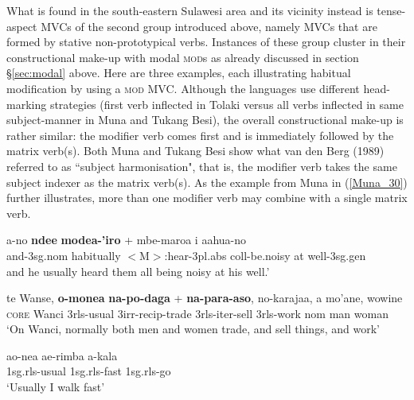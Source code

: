 What is found in the south-eastern Sulawesi area and its vicinity instead is tense-aspect MVCs of the second group introduced above, namely MVCs that are formed by stative non-prototypical verbs. Instances of these group cluster in their constructional make-up with modal \textsc{mod}s as already discussed in section §\ref{sec:modal} above. Here are three examples, each illustrating habitual modification by using a \textsc{mod} MVC. Although the languages use different head-marking strategies (first verb inflected in Tolaki versus all verbs inflected in same subject-manner in Muna and Tukang Besi), the overall constructional make-up is rather similar: the modifier verb comes first and is immediately followed by the matrix verb(s). Both Muna and Tukang Besi show what van den Berg (1989) referred to as ``subject harmonisation", that is, the modifier verb takes the same subject indexer as the matrix verb(s). As the example from Muna in (\ref{Muna_30}) further illustrates, more than one modifier verb may combine with a single matrix verb.

\ea \label{Tolaki_39}
\gll a-no \textbf{ndee} \textbf{modea-'iro} + mbe-maroa i aahua-no \\
and-3\acs{sg}.\acs{nom} habitually $<$M$>$:hear-3\acs{pl}.\acs{abs} \acs{coll}-be.noisy at well-3\acs{sg}.\acs{gen} \\
\glft * and he usually heard them all being noisy at his well.' \\ 
\z
\xe

\ea \label{Tukang_62}
\gll te Wanse, \textbf{o-monea} \textbf{na-po-daga} + \textbf{na-para-aso}, no-karajaa, a mo'ane, wowine \\
\textsc{core} Wanci 3\acs{rls}-usual 3\acs{irr}-\acs{recip}-trade 3\acs{rls}-\acs{iter}-sell 3\acs{rls}-work \acs{nom} man woman \\
\glft `On Wanci, normally both men and women trade, and sell things, and work' \\ 
\z
\xe

\ea \label{Muna_30}
\gll ao-nea ae-rimba a-kala \\
1\acs{sg}.\acs{rls}-usual 1\acs{sg}.\acs{rls}-fast 1\acs{sg}.\acs{rls}-go \\
\glft `Usually I walk fast' \\ 
\z
\xe


